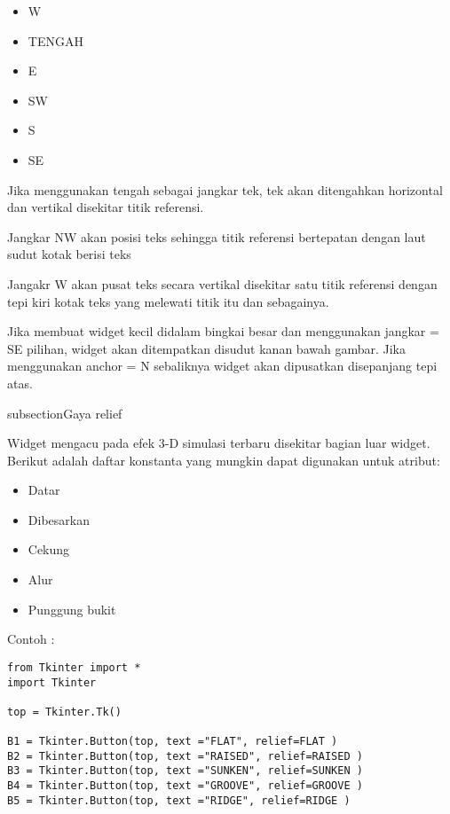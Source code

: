 \documentclass [12pt,a4paper,notitlepage,oneside,bahasa]{article}
\begin{document}
\begin{enumerate}
\begin{itemize}
\begin{itemize}
\begin{itemize}
		\item W
		\item TENGAH
		\item E
		\item SW
		\item S
		\item SE
	\end{itemize}
\end{itemize}
 \par
\vspace{12pt}
Jika menggunakan tengah sebagai jangkar tek, tek akan ditengahkan horizontal dan vertikal disekitar titik referensi. \par
Jangkar NW akan posisi teks sehingga titik referensi bertepatan dengan laut sudut kotak berisi teks \par
Jangakr W akan pusat teks secara vertikal disekitar satu titik referensi dengan tepi kiri kotak teks yang melewati titik itu dan sebagainya. \par
Jika membuat widget kecil didalam bingkai besar dan menggunakan jangkar = SE pilihan, widget akan ditempatkan disudut kanan bawah gambar. Jika menggunakan anchor = N sebaliknya widget akan dipusatkan disepanjang tepi atas. \par
\noindent 

subsection{Gaya relief}

Widget mengacu pada efek 3-D simulasi terbaru disekitar bagian luar widget. Berikut adalah daftar konstanta yang mungkin dapat digunakan untuk atribut:
\begin{itemize}
	\item Datar
	\item Dibesarkan
	\item Cekung
	\item Alur
	\item Punggung bukit
\end{itemize}


\vspace{12pt}
Contoh : \par
\begin{verbatim}
from Tkinter import *
import Tkinter

top = Tkinter.Tk()

B1 = Tkinter.Button(top, text ="FLAT", relief=FLAT )
B2 = Tkinter.Button(top, text ="RAISED", relief=RAISED )
B3 = Tkinter.Button(top, text ="SUNKEN", relief=SUNKEN )
B4 = Tkinter.Button(top, text ="GROOVE", relief=GROOVE )
B5 = Tkinter.Button(top, text ="RIDGE", relief=RIDGE )


\end{verbatim}
\end{itemize}
\end{enumerate}
\end{document}
